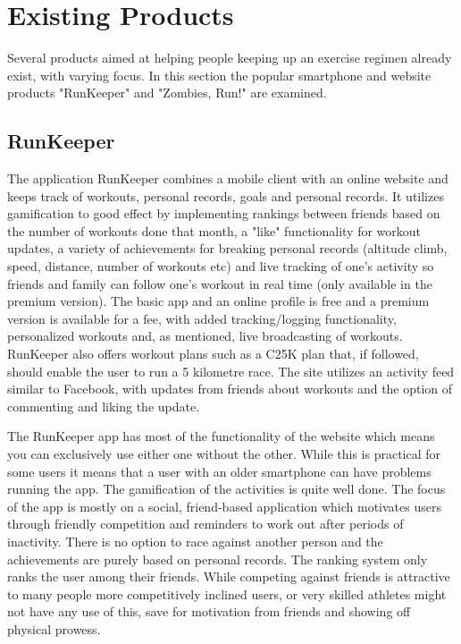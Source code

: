 \section{Existing Products}
Several products aimed at helping people keeping up an exercise regimen already exist, with varying focus. In this section the popular smartphone and website products "RunKeeper" and "Zombies, Run!" are examined. 

\subsection{RunKeeper}
The application RunKeeper combines a mobile client with an online website and keeps track of workouts, personal records, goals and personal records. It utilizes gamification to good effect by implementing rankings between friends based on the number of workouts done that month, a "like" functionality for workout updates, a variety of achievements for breaking personal records (altitude climb, speed, distance, number of workouts etc) and live tracking of one's activity so friends and family can follow one's workout in real time (only available in the premium version). The basic app and an online profile is free and a premium version is available for a fee, with added tracking/logging functionality, personalized workouts and, as mentioned, live broadcasting of workouts. RunKeeper also offers workout plans such as a \ac{C25K} plan that, if followed, should enable the user to run a 5 kilometre race. The site utilizes an activity feed similar to Facebook, with updates from friends about workouts and the option of commenting and liking the update. 
\vspace{10pt}

The RunKeeper app has most of the functionality of the website which means you can exclusively use either one without the other. While this is practical for some users it means that a user with an older smartphone can have problems running the app. The gamification of the activities is quite well done. The focus of the app is mostly on a social, friend-based application which motivates users through friendly competition and reminders to work out after periods of inactivity. There is no option to race against another person and the achievements are purely based on personal records. The ranking system only ranks the user among their friends. While competing against friends is attractive to many people more competitively inclined users, or very skilled athletes might not have any use of this, save for motivation from friends and showing off physical prowess.
\vspace{10pt}

